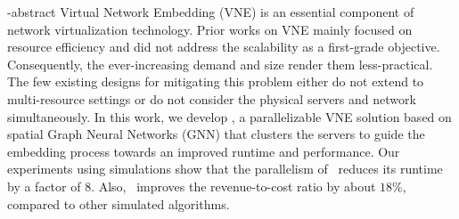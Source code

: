 
\en-abstract{
Virtual Network Embedding (VNE) is an essential component of network virtualization technology. 
%
Prior works on VNE mainly focused on resource efficiency and did not address the scalability as a first-grade objective. Consequently, the ever-increasing demand and size render them less-practical.
%
The few existing designs for mitigating this problem either do not extend to multi-resource settings or do not consider the physical servers and network simultaneously.
%
In this work, we develop \ourAlg, a parallelizable VNE solution based on spatial Graph Neural Networks (GNN) that clusters the servers to guide the embedding process towards an improved runtime and performance. 
%
Our experiments using simulations show that the parallelism of \ourAlg\ reduces its runtime by a factor of $8$. Also, \ourAlg\ improves the revenue-to-cost ratio by about $18\%$, compared to other simulated algorithms.
}
